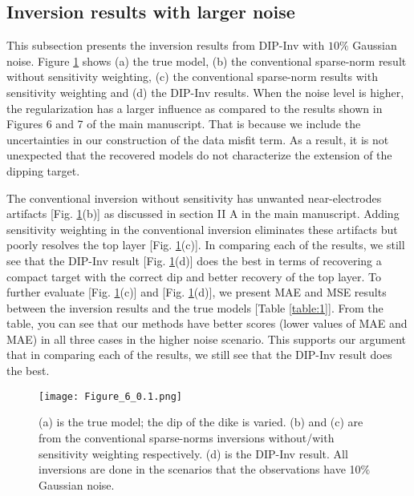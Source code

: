 \documentclass{article}
\begin{document}
\subsection{Inversion results with larger noise}
This subsection presents the inversion results from DIP-Inv with $10\%$ Gaussian noise. Figure \ref{fig_1} shows (a) the true model, (b) the conventional sparse-norm result without sensitivity weighting, (c) the conventional sparse-norm results with sensitivity weighting and (d) the DIP-Inv results. When the noise level is higher, the regularization has a larger influence as compared to the results shown in Figures 6 and 7 of the main manuscript. That is because we include the uncertainties in our construction of the data misfit term. As a result, it is not unexpected that the recovered models do not characterize the extension of the dipping target. 

The conventional inversion without sensitivity has unwanted near-electrodes artifacts [Fig. \ref{fig_1}(b)] as discussed in section II A in the main manuscript. Adding sensitivity weighting in the conventional inversion eliminates these artifacts but poorly resolves the top layer [Fig. \ref{fig_1}(c)]. In comparing each of the results, we still see that the DIP-Inv result [Fig. \ref{fig_1}(d)] does the best in terms of recovering a compact target with the correct dip and better recovery of the top layer. To further evaluate [Fig. \ref{fig_1}(c)] and [Fig. \ref{fig_1}(d)], we present MAE and MSE results between the inversion results and the true models [Table \ref{table:1}]. From the table, you can see that our methods have better scores (lower values of MAE and MAE) in all three cases in the higher noise scenario. This supports our argument that in comparing each of the results, we still see that the DIP-Inv result does the best.  

\begin{figure}[h!]
\centering
\texttt{[image: Figure\_6\_0.1.png]}
\caption{(a) is the true model; the dip of the dike is varied. (b) and (c) are from the conventional sparse-norms inversions without/with sensitivity weighting respectively. (d) is the DIP-Inv result. All inversions are done in the scenarios that the observations have 10$\%$ Gaussian noise.}
\label{fig_1}
\end{figure}
\end{document}
